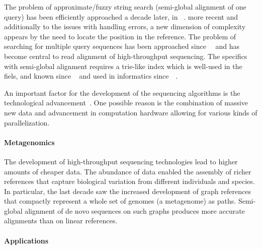 The problem of approximate/fuzzy string search (semi-global alignment of one
query) has been efficiently approached a decade later, in
\citeyear{sellers1980theory}~\cite{sellers1980theory,smith1981identification}.
more recent and additionally to the issues with handling errors, a new dimension
of complexity appears by the need to locate the position in the reference. The
problem of searching for multiple query sequences has been approached
since~\citeyear{pearson1988improved}~\cite{pearson1988improved} and has become
central to read alignment of high-throughput sequencing. The specifics with
semi-global alignment requires a trie-like index which is well-used in the
fiels, and known since
\citeyear{thue1912gegenseitige}~\cite{thue1912gegenseitige} and used in
informatics since~\citeyear{de1959file}~\cite{de1959file}.

An important factor for the development of the sequencing algorithms is the
technological advancement~\cite{alser2021technology}. One possible reason is the
combination of massive new data and advancement in computation hardware allowing
for various kinds of parallelization.

\paragraph{Metagenomics}
The development of high-throughput sequencing technologies lead to higher
amounts of cheaper data. The abundance of data enabled the assembly of richer
references that capture biological variation from different individuals and
species. In particular, the last decade saw the increased development of graph
references that compactly represent a whole set of genomes (a metagenome) as
paths. Semi-global alignment of de novo sequences on such graphs produces more
accurate alignments than on linear references.

\paragraph{Applications}


